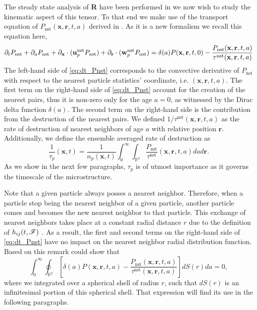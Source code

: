 The steady state analysis of \textbf{R} have been performed in \citet{fintzi2024buoyancy} we now wish to study the kinematic aspect of this tensor. 
To that end we make use of the transport equation of $P_\text{nst}(\textbf{x},\textbf{r},t,a)$ derived in \citet{zhang2023evolution}.
As it is a new formalism we recall this equation here, 
\begin{equation}
    \partial_t P_\text{nst}
    + \partial_a P_\text{nst}
    + {\partial_\textbf{x}} \cdot  (\textbf{u}^\text{nst}_p P_\text{nst})
    + {\partial_\textbf{r}} \cdot  (\textbf{w}^\text{nst}_p P_\text{nst})
    = \delta(a)P(\textbf{x},\textbf{r},t,0)
    - \frac{P_\text{nst}(\textbf{x},\textbf{r},t,a)}{\tau^\text{nst}(\textbf{x},\textbf{r},t,a)}
    \label{eq:dt_Pnst}
\end{equation}
The left-hand side of \ref{eq:dt_Pnst} corresponds to the convective derivative of $P_\text{nst}$ with respect to the nearest particle statistics' coordinate, i.e. $(\textbf{x},\textbf{r},t,a)$. 
The first term on the right-hand side of \ref{eq:dt_Pnst} account for the creation of the nearest pairs, thus it is non-zero only for the age $a = 0$, as witnessed by the Dirac delta function $\delta(a)$. 
The second term on the right-hand side is the contribution from the destruction of the nearest pairs.
We defined $1/\tau^\text{nst}(\textbf{x},\textbf{r},t,a)$ as the rate of destruction of nearest neighbors of age $a$ with relative position $\textbf{r}$.
Additionally, we define the ensemble averaged rate of destruction as
\begin{equation}
    \frac{1}{\tau_p}(\textbf{x},t) = 
    \frac{1}{n_p(\textbf{x},t)}
    \int_{0}^\infty
    \int_{\mathbb{R}^3}
    \frac{P_\text{nst} }{\tau^\text{nst}}(\textbf{x},\textbf{r},t,a)
    da d\textbf{r}. 
    \label{eq:tau_p}
\end{equation}
As we show in the next few paragraphs, $\tau_p$ is of utmost importance as it governs the timescale of the microstructure.

Note that a given particle always posses a nearest neighbor.
Therefore, when a particle stop being the nearest neighbor of a given particle, another particle comes and becomes the new nearest neighbor to that particle.
This exchange of nearest neighbors takes place at a constant radial distance $r$ due to the definition of $h_{ij}(t,\mathscr{F})$ \citep{zhang2021ensemble}. 
As a result, the first and second terms on the right-hand side of \ref{eq:dt_Pnst} have no impact on the nearest neighbor radial distribution function. 
Based on this remark \citep{zhang2023evolution} could show that
\begin{equation}
    \int_{0}^{\infty}\oint_{\mathbb{R}^2}\left[
        \delta(a)P(\textbf{x},\textbf{r},t,a)
    - \frac{P_\text{nst}(\textbf{x},\textbf{r},t,a)}{\tau^\text{nst}(\textbf{x},\textbf{r},t,a)}
    \right]dS(r) da    
    =0,
    \label{eq:int_dt_h}
\end{equation}
where we integrated over a spherical shell of radius $r$, such that $dS(r)$ is an infinitesimal portion of this spherical shell. 
That expression will find its use in the following paragraphs. 


